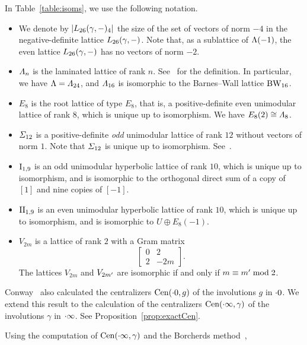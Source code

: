 \documentclass{amsart} %
\begin{document}
%
In Table~\ref{table:isoms}, we use the following notation.
\begin{itemize}
\item
We denote by $|L_{26}(\gamma, -)_4|$
the size of the set of vectors of norm $-4$ in the negative-definite lattice $L_{26}(\gamma, -)$.
Note that, as a sublattice of $\Lambda(-1)$, 
the even lattice $L_{26}(\gamma, -)$ has no vectors of norm $-2$.
\item 
$\varLambda_{n} $ is 
the laminated lattice of rank $n$. 
See~\cite[Chapter 6]{theCSbook} for the definition.
In particular, we have $\Lambda=\varLambda_{24}$, 
and $\varLambda_{16}$ is isomorphic to the Barnes--Wall lattice $\mathrm{BW}_{16}$.
\item $E_8$ is the root lattice of type $E_8$, that is,
a positive-definite even unimodular lattice of rank $8$,
which is unique up to isomorphism.
We have $E_8(2)\cong \varLambda_{8}$.
\item $\varSigma_{12}$ is 
a positive-definite \emph{odd} unimodular lattice of rank $12$
without vectors of norm $1$.
Note that $\varSigma_{12}$ is unique up to isomorphism.
See~\cite[Table 16.7]{theCSbook}.
\item $\mathrm{I}_{1,9}$ is an odd unimodular hyperbolic lattice of rank $10$, 
which is unique up to isomorphism,
and is isomorphic to the orthogonal direct sum of
 a copy of $[1]$ and nine copies of $[-1]$.
 \item $\mathrm{II}_{1,9}$ is an even unimodular hyperbolic lattice of rank $10$,
 which is unique up to isomorphism,
 and is isomorphic to $U\oplus E_8(-1)$.
\item $V_{2m}$ is a lattice of rank $2$
with a Gram matrix 
%
\begin{equation}\label{eq:GramVm}
\left[\begin{array}{cc} 0&2 \\ 2 & -2m \end{array}\right].
\end{equation}
%
The lattices $V_{2m}$ and $V_{2m^{\prime}}$ are isomorphic 
if and only if $m\equiv m^{\prime} \bmod 2$.
\end{itemize}
%
\par
\medskip
Conway~\cite[Chapter 10]{theCSbook} also calculated the centralizers $\mathrm{Cen}(\cdot 0, g)$
of the involutions $g$ in $\cdot 0$.
We extend this result to the calculation of the centralizers $\mathrm{Cen}(\cdot \infty, \gamma)$
of the involutions $\gamma$ in $\cdot \infty$. See Proposition~\ref{prop:exactCen}.
\par
Using the computation of $\mathrm{Cen}(\cdot \infty, \gamma)$
and the Borcherds method~\cite{MR913200, MR1654763},
\end{document}
